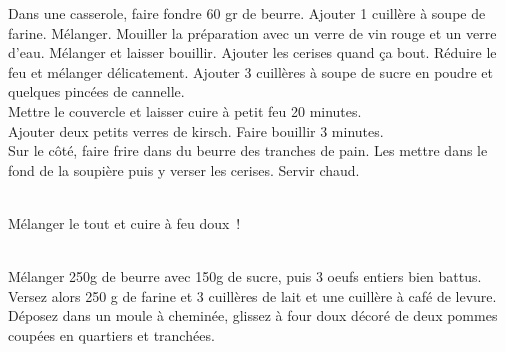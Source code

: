 \begin{minipage}[c]{\textwidth}
Dans une casserole, faire fondre 60 gr de beurre. Ajouter 1 cuillère à soupe de farine. Mélanger. Mouiller la préparation avec un verre de vin rouge et un verre d’eau. Mélanger et laisser bouillir. Ajouter les cerises quand ça bout. Réduire le feu et mélanger délicatement. Ajouter 3 cuillères à soupe de sucre en poudre et quelques pincées de cannelle. \\
Mettre le couvercle et laisser cuire à petit feu 20 minutes.\\
Ajouter deux petits verres de kirsch. Faire bouillir 3 minutes.\\
Sur le côté, faire frire dans du beurre des tranches de pain. Les mettre dans le fond de la soupière puis y verser les cerises. Servir chaud. \\
\\

\end{minipage}

\begin{minipage}[c]{\textwidth}
Mélanger le tout et cuire à feu doux !\\
\\

\end{minipage}

\begin{minipage}[c]{\textwidth}
Mélanger 250g de beurre avec 150g de sucre, puis 3 oeufs entiers bien battus. Versez alors 250 g de farine et 3 cuillères de lait et une cuillère à café de levure.  Déposez dans un moule à cheminée, glissez à four doux décoré de deux pommes coupées en quartiers et tranchées.\\
\\

\end{minipage}

